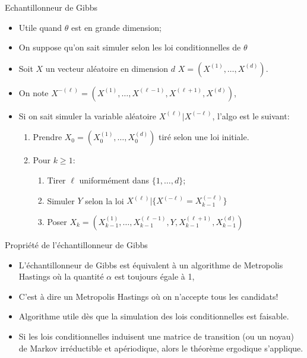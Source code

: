 \documentclass[9pt,ignorenonframetext,]{beamer}
\providecommand{\tightlist}{%
  \setlength{\itemsep}{0pt}\setlength{\parskip}{0pt}}
\begin{document}
\begin{frame}{Echantillonneur de Gibbs}
\protect\hypertarget{echantillonneur-de-gibbs}{}

\begin{itemize}
\item
  Utile quand \(\theta\) est en grande dimension;
\item
  On suppose qu'on sait simuler selon les loi conditionnelles de
  \(\theta\)\pause
\item
  Soit \(X\) un vecteur aléatoire en dimension \(d\)
  \(X = (X^{(1)},\dots, X^{(d)})\).
\item
  On note
  \(X^{-(\ell)} = (X^{(1)},\dots, X^{(\ell-1)}, X^{(\ell+1)}, X^{(d)})\),
\item
  Si on sait simuler la variable aléatoire
  \(X^{(\ell)}\vert X^{(-\ell)}\), l'algo est le suivant:

  \begin{enumerate}
  \item Prendre $X_0 = (X_0^{(1)},\dots, X_0^{(d)})$ tiré selon une loi initiale.
  \item Pour $k \geq 1$:
  \begin{enumerate}
  \item Tirer $\ell$ uniformément dans $\lbrace1,\dots,d\rbrace$;
  \item Simuler $Y$ selon la loi $X^{(\ell)} \vert \lbrace X^{(-\ell)} = X_{k-1}^{(-\ell)} \rbrace$
  \item Poser $X_k = (X_{k - 1}^{(1)},\dots, X_{k-1}^{(\ell-1)}, Y, X_{k - 1}^{(\ell+1)}, X_{k-1}^{(d)})$
  \end{enumerate}
  \end{enumerate}
\end{itemize}

\end{frame}

\begin{frame}{Propriété de l'échantillonneur de Gibbs}
\protect\hypertarget{propriuxe9tuxe9-de-luxe9chantillonneur-de-gibbs}{}

\begin{itemize}
\tightlist
\item
  L'échantillonneur de Gibbs est équivalent à un algorithme de
  Metropolis Hastings où la quantité \(\alpha\) est toujours égale à 1,
\item
  C'est à dire un Metropolis Hastings où on n'accepte tous les
  candidats!
\item
  Algorithme utile dès que la simulation des lois conditionnelles est
  faisable.
\item
  Si les lois conditionnelles induisent une matrice de transition (ou un
  noyau) de Markov irréductible et apériodique, alors le théorème
  ergodique s'applique.
\end{itemize}

\end{frame}
\end{document}
